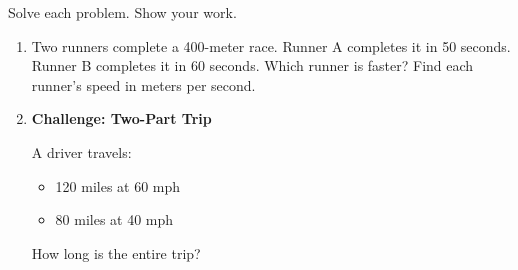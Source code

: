 \documentclass[12pt, letterpaper, fleqn]{article}
\begin{document}
\noindent
Solve each problem. Show your work.

\vspace{3mm}

\begin{enumerate}[itemsep=2cm, leftmargin=0.6cm]

\item Two runners complete a 400-meter race. Runner A completes it in 50 seconds. Runner B completes it in 60 seconds. Which runner is faster? Find each runner's speed in meters per second.\\
\vspace{2.5cm}

\item \textbf{Challenge: Two-Part Trip}

\medskip

A driver travels:

\begin{itemize}
\item 120 miles at 60 mph
\item 80 miles at 40 mph
\end{itemize}

How long is the entire trip?

\vspace{3cm}


\end{enumerate}
\end{document}
